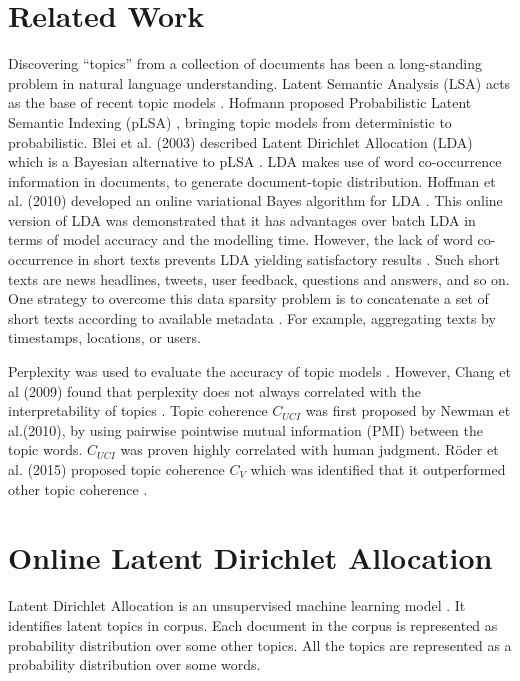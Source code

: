 \documentclass{article} %
\begin{document}
\section{Related Work}
\label{gen_inst}

Discovering “topics” from a collection of documents has been a long-standing problem
in natural language understanding. Latent Semantic Analysis (LSA) acts as the base of
recent topic models \cite{deerwester_indexing_1990}. Hofmann proposed Probabilistic Latent Semantic Indexing (pLSA) \cite{hofmann_probabilistic_2017}, bringing topic models from deterministic to probabilistic. Blei et al. (2003) described Latent Dirichlet Allocation (LDA) which is a Bayesian alternative to pLSA \cite{blei_latent_2003}. LDA makes use of word co-occurrence information in documents, to generate document-topic distribution. Hoffman et al. (2010) developed an online variational Bayes algorithm for LDA \cite{hoffman_online_2010}. This online version of LDA was demonstrated that it has advantages over batch LDA in terms of model accuracy and the modelling time.
However, the lack of word co-occurrence in short texts prevents LDA yielding satisfactory
results \cite{li_topic_2016}. Such short texts are news headlines, tweets, user feedback, questions and answers, and so on. One strategy to overcome this data sparsity problem is to concatenate a set of short texts according to available metadata \cite{weng_twitterrank:_2010, hong_empirical_2010, mehrotra_improving_2013}. For example, aggregating texts by timestamps, locations, or users.

Perplexity was used to evaluate the accuracy of topic models \cite{wallach_evaluation_2009}. However, Chang et al (2009) found that perplexity does not always correlated with the interpretability of topics \cite{chang_reading_2009}. Topic coherence $C_{UCI}$ was first proposed by Newman et al.(2010)\cite{newman_automatic_nodate}, by using pairwise pointwise mutual information (PMI) between the topic words. $C_{UCI}$  was proven highly correlated with human judgment. Röder et al. (2015) proposed topic coherence $C_{V}$ which was identified that it outperformed other topic coherence \cite{roder_exploring_2015}.

\section{Online Latent Dirichlet Allocation}
Latent Dirichlet Allocation is an unsupervised machine learning model \cite{blei_latent_2003}. It identifies latent topics in corpus. Each document in the corpus is represented as probability distribution over some other topics. All the topics are represented as a probability distribution over some words.
\end{document}
